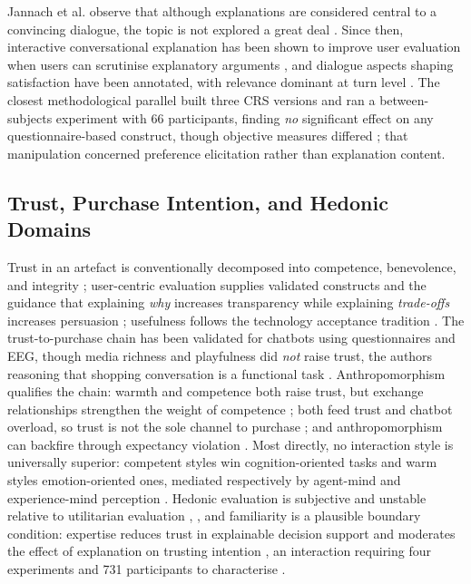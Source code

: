 \documentclass[conference]{IEEEtran}
\begin{document}
Jannach et al. observe that although explanations are considered central to a convincing
dialogue, the topic is not explored a great deal \cite{jannach2021}. Since then, interactive
conversational explanation has been shown to improve user evaluation when users can
scrutinise explanatory arguments \cite{ziegler2023}, and dialogue aspects shaping
satisfaction have been annotated, with relevance dominant at turn level \cite{siro2023}.
The closest methodological parallel built three CRS versions and ran a between-subjects
experiment with 66 participants, finding \textit{no} significant effect on any
questionnaire-based construct, though objective measures differed \cite{ziegfeld2025}; that
manipulation concerned preference elicitation rather than explanation content.

\subsection{Trust, Purchase Intention, and Hedonic Domains}

Trust in an artefact is conventionally decomposed into competence, benevolence, and
integrity \cite{mcknight2002}; user-centric evaluation supplies validated constructs and
the guidance that explaining \textit{why} increases transparency while explaining
\textit{trade-offs} increases persuasion \cite{pu2012}; usefulness follows the technology
acceptance tradition \cite{davis1989}. The trust-to-purchase chain has been validated for
chatbots using questionnaires and EEG, though media richness and playfulness did
\textit{not} raise trust, the authors reasoning that shopping conversation is a functional
task \cite{yen2021}. Anthropomorphism qualifies the chain: warmth and competence both raise
trust, but exchange relationships strengthen the weight of competence \cite{cheng2022};
both feed trust and chatbot overload, so trust is not the sole channel to purchase
\cite{liyang2025}; and anthropomorphism can backfire through expectancy violation
\cite{crolic2022}. Most directly, no interaction style is universally superior: competent
styles win cognition-oriented tasks and warm styles emotion-oriented ones, mediated
respectively by agent-mind and experience-mind perception \cite{libaoku2024}. Hedonic
evaluation is subjective and unstable relative to utilitarian evaluation \cite{wangx2022},
\cite{varga2024}, and familiarity is a plausible boundary condition: expertise reduces
trust in explainable decision support and moderates the effect of explanation on trusting
intention \cite{bayer2023}, an interaction requiring four experiments and 731 participants
to characterise \cite{celar2023}.
\end{document}
